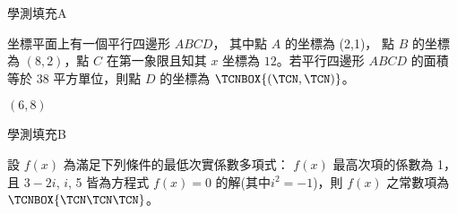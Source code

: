 \begin{QUESTIONS}
    \begin{QUESTION}
        \begin{ExamInfo}{99}{學測}{填充}{A}
        \end{ExamInfo}
        \begin{ExamAnsRateInfo}{29}{64}{19}{4}
        \end{ExamAnsRateInfo}
        \begin{QBODY}
            坐標平面上有一個平行四邊形 $ABCD$， 其中點 $A$ 的坐標為 (2,1)， 點 $B$ 的坐標為 $(8, 2)$，點 $C$ 在第一象限且知其 $x$ 坐標為 $12$。若平行四邊形 $ABCD$ 的面積等於 38 平方單位，則點 $D$ 的坐標為 $\TCNBOX{(\TCN,\TCN)}$。
        \end{QBODY}
        \begin{QFROMS}
        \end{QFROMS}
        \begin{QTAGS}\end{QTAGS}
        \begin{QANS}
            $(6,8)$
        \end{QANS}
        \begin{QSOLLIST}
        \end{QSOLLIST}
        \begin{QEMPTYSPACE}
        \end{QEMPTYSPACE}
    \end{QUESTION}
    \begin{QUESTION}
        \begin{ExamInfo}{99}{學測}{填充}{B}
        \end{ExamInfo}
        \begin{ExamAnsRateInfo}{29}{71}{15}{1}
        \end{ExamAnsRateInfo}
        \begin{QBODY}
            設 $f(x)$ 為滿足下列條件的最低次實係數多項式： $f(x)$ 最高次項的係數為 1，且 $3 - 2i$, $i$, 5 皆為方程式 $f(x)=0$ 的解(其中$i^2 =-1$)，則 $f(x)$ 之常數項為	$\TCNBOX{\TCN\TCN\TCN}$。
        \end{QBODY}
        \begin{QFROMS}
        \end{QFROMS}
        \begin{QTAGS}\end{QTAGS}
        \begin{QANS}

\end{QANS}
\end{QUESTION}
\end{QUESTIONS}
